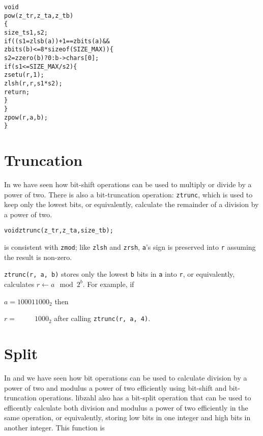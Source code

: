 \begin{alltt}
   void
   pow(z_t r, z_t a, z_t b)
   \{
       size_t s1, s2;
       if ((s1 = zlsb(a)) + 1 == zbits(a) &&
                     zbits(b) <= 8 * sizeof(SIZE_MAX)) \{
           s2 = zzero(b) ? 0 : b->chars[0];
           if (s1 <= SIZE_MAX / s2) \{
               zsetu(r, 1);
               zlsh(r, r, s1 * s2);
               return;
           \}
       \}
       zpow(r, a, b);
   \}
\end{alltt}


\newpage
\section{Truncation}
\label{sec:Truncation}

In  we have seen how bit-shift
operations can be used to multiply or divide by a
power of two. There is also a bit-truncation
operation: {\tt ztrunc}, which is used to keep
only the lowest bits, or equivalently, calculate
the remainder of a division by a power of two.

\begin{alltt}
   void ztrunc(z_t r, z_t a, size_t b);
\end{alltt}

\noindent
is consistent with {\tt zmod}; like {\tt zlsh} and
{\tt zrsh}, {\tt a}'s sign is preserved into {\tt r}
assuming the result is non-zero.

{\tt ztrunc(r, a, b)} stores only the lowest {\tt b}
bits in {\tt a} into {\tt r}, or equivalently,
calculates $r \gets a \mod 2^b$. For example, if

$a = 100011000_2$ then

$r = \phantom{10001}1000_2$ after calling
{\tt ztrunc(r, a, 4)}.


\newpage
\section{Split}
\label{sec:Split}

In  and 
we have seen how bit operations can be used to
calculate division by a power of two and
modulus a power of two efficiently using
bit-shift and bit-truncation operations. libzahl
also has a bit-split operation that can be used
to efficently calculate both division and
modulus a power of two efficiently in the same
operation, or equivalently, storing low bits
in one integer and high bits in another integer.
This function is

